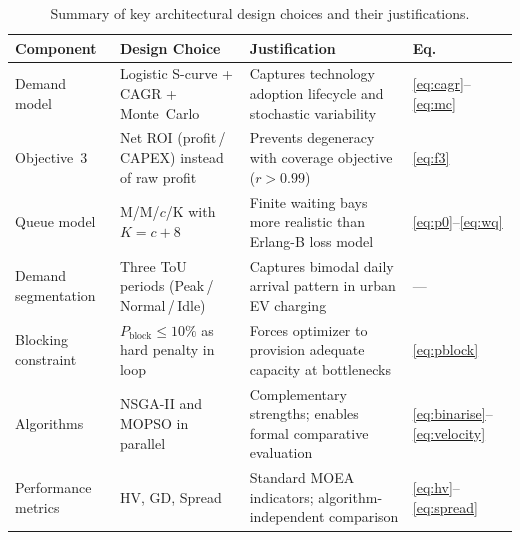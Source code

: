 \begin{table}[htbp]
\centering
\small
\caption{Summary of key architectural design choices and their justifications.}
\label{tab:arch_summary}
\setlength{\tabcolsep}{5pt}
\renewcommand{\arraystretch}{1.3}
\begin{tabular}{|p{9em}|p{10.5em}|p{12em}|p{4em}|}
\hline
\textbf{Component} & \textbf{Design Choice} & \textbf{Justification}
                   & \textbf{Eq.} \\
\hline
Demand model &
Logistic S-curve + CAGR + Monte~Carlo &
Captures technology adoption lifecycle and stochastic variability &
\eqref{eq:cagr}--\eqref{eq:mc} \\
\hline
Objective~3 &
Net ROI (profit\,/\,CAPEX) instead of raw profit &
Prevents degeneracy with coverage objective ($r > 0.99$) &
\eqref{eq:f3} \\
\hline
Queue model &
M/M/$c$/K with $K = c + 8$ &
Finite waiting bays more realistic than Erlang-B loss model &
\eqref{eq:p0}--\eqref{eq:wq} \\
\hline
Demand segmentation &
Three ToU periods (Peak\,/\,Normal\,/\,Idle) &
Captures bimodal daily arrival pattern in urban EV charging &
--- \\
\hline
Blocking constraint &
$P_{\text{block}} \leq 10\%$ as hard penalty in loop &
Forces optimizer to provision adequate capacity at bottlenecks &
\eqref{eq:pblock} \\
\hline
Algorithms &
NSGA-II and MOPSO in parallel &
Complementary strengths; enables formal comparative evaluation &
\eqref{eq:binarise}--\eqref{eq:velocity} \\
\hline
Performance metrics &
HV, GD, Spread &
Standard MOEA indicators; algorithm-independent comparison &
\eqref{eq:hv}--\eqref{eq:spread} \\
\hline
\end{tabular}
\end{table}
